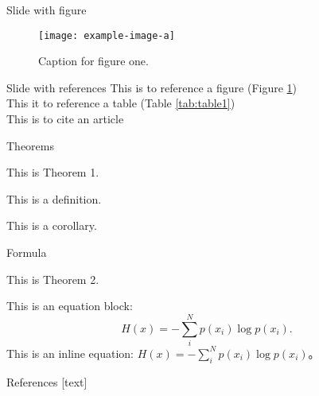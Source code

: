 \documentclass[aspectratio=169,xcolor=dvipsnames, t]{beamer}
\begin{document}
    \begin{frame}{Slide with figure}
        \begin{figure}[H]
            \centering
            \texttt{[image: example-image-a]}
            \caption{Caption for figure one.}
            \label{fig:figure1}
        \end{figure}
    \end{frame}

    \begin{frame}{Slide with references}
        This is to reference a figure (Figure \ref{fig:figure1})\\
        This it to reference a table (Table \ref{tab:table1})\\
        This is to cite an article \cite{vaswani2017attention}\\
    \end{frame}

    \begin{frame}{Theorems}
        \begin{theorem}
            This is Theorem 1.
        \end{theorem}
        \begin{definition}
            This is a definition. 
        \end{definition}
        \begin{corollary}
            This is a corollary. 
        \end{corollary}
    \end{frame}

    \begin{frame}{Formula}
        \begin{theorem}
            This is Theorem 2. 
        \end{theorem}
        This is an equation block: 
        \begin{equation}
            H(x)=-\sum\limits_i^Np(x_i)\log p(x_i).
        \end{equation}
        This is an inline equation: $H(x)=-\sum\limits_i^Np(x_i)\log p(x_i)$。
    \end{frame}


\begin{frame}[allowframebreaks]{References}
    \newcommand{\ftcmu}{\fontspec{CMU Serif}\selectfont}
    \renewcommand{\bibfont}{\ftcmu}
    [text]
    \vspace{-20pt}
    \begin{multicols}{2}
        \printbibliography[heading=none]
    \end{multicols}
\end{frame}
\end{document}

